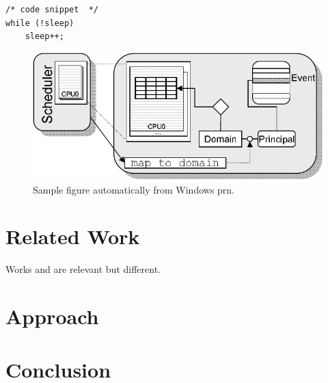 \documentclass[10pt,twocolumn,a4paper]{article}
\begin{document}
\begin{lstlisting}
/* code snippet  */
while (!sleep)
	sleep++;
\end{lstlisting}

\begin{figure}[hbt]
\centering
\includegraphics[scale=.7,clip]{fig/template}
\caption{Sample figure automatically from Windows prn.\label{plot:fig}}
\end{figure}

\section{Related Work}\label{sec:relwork} 

Works \cite{xen03virtualization} and \cite{pratt2005xaa} are relevant but
different.

\section{Approach}

\section{Conclusion}\label{sec:conclusion}



\end{document}
